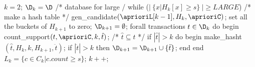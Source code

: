 $k=2$;
$\D_k = \D$ /* database for large \kitemsets */
while ($|\ \{x | H_k[x]\geq s\}\ | \geq LARGE$) {
  /* make a hash table */
	gen_candidate$(\aprioriL[k-1], H_k, \aprioriC)$;
	set all the buckets of $H_{k+1}$ to zero;
	$\D_{k+1} = \emptyset$;
	forall transactions $t\in \D_k$ do begin
		count_support$(t, \aprioriC, k, \hat{t})$; /* $\hat{t}\subseteq t$ */
		if $|\hat{t}| > k$ do begin
			make_hasht$(\hat{t}, H_k, k, H_{k+1}, \ddot{t})$;
			if $|\ddot{t}| > k$ then $\D_{k+1} = \D_{k+1}\cup\{\ddot{t}\}$;
		end
	end
	$L_k=\{c\in C_k | c.count\geq s\}$;
	$k++$;
}
